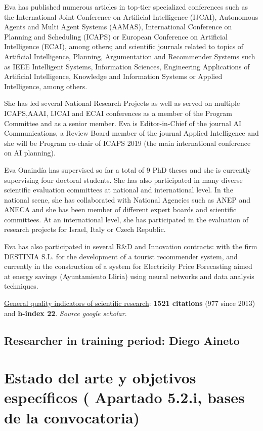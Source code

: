\documentclass[10pt,a4paper]{paper}
\begin{document}
Eva has published numerous articles in top-tier specialized conferences such as the International Joint Conference on Artificial Intelligence (IJCAI), Autonomous Agents and Multi Agent Systems (AAMAS), International Conference on Planning and Scheduling (ICAPS) or European Conference on Artificial Intelligence (ECAI), among others; and scientific journals related to topics of Artificial Intelligence, Planning, Argumentation and Recommender Systems such as IEEE Intelligent Systems, Information Sciences, Engineering Applications of Artificial Intelligence, Knowledge and Information Systems or Applied Intelligence, among others.

She has led several National Research Projects as well as served on multiple ICAPS,AAAI, IJCAI and ECAI conferences as a member of the Program Committee and as a senior member. Eva is Editor-in-Chief of the journal AI Communications, a Review Board member of the journal Applied Intelligence and she will be Program co-chair of ICAPS 2019 (the main international conference on AI planning). 

Eva Onaindía has supervised so far a total of 9 PhD theses and she is currently supervising four doctoral students. She has also participated in many diverse scientific evaluation committees at national and international level. In the national scene, she has collaborated with National Agencies such as ANEP and ANECA and she has been member of different expert boards and scientific committees. At an international level, she has participated in the evaluation of research projects for Israel, Italy or Czech Republic.

Eva has also participated in several R\&D and Innovation contracts: with the firm DESTINIA S.L. for the development of a tourist recommender system, and currently in the construction of a system for Electricity Price Forecasting aimed at energy savings (Ayuntamiento Lliria) using neural networks and data analysis techniques.

\underline{General quality indicators of scientific research}: {\bf 1521 citations} (977 since 2013) and {\bf h-index 22}. {\scriptsize\em Source google scholar}.


\subsection{Researcher in training period: Diego Aineto}


\newpage
\section{Estado del arte y objetivos específicos ( Apartado 5.2.i, bases de la convocatoria)}
\end{document}
